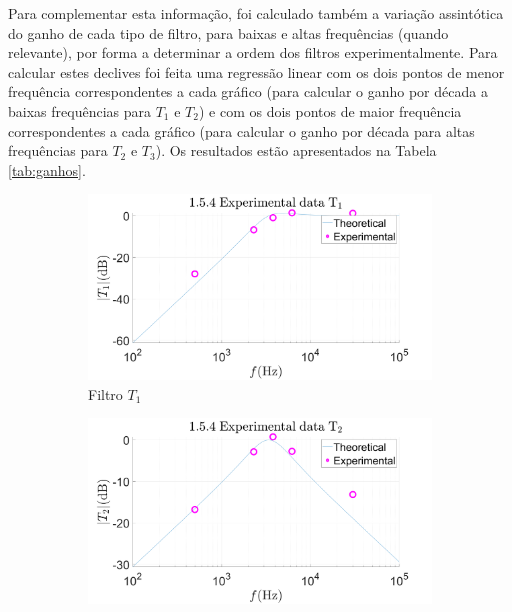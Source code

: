 Para complementar esta informação, foi calculado também a variação assintótica do ganho de cada tipo de filtro, para baixas e altas frequências (quando relevante), por forma a determinar a ordem dos filtros experimentalmente. Para calcular estes declives foi feita uma regressão linear com os dois pontos de menor frequência correspondentes a cada gráfico (para calcular o ganho por década a baixas frequências para $T_1$ e $T_2$) e com os dois pontos de maior frequência correspondentes a cada gráfico (para calcular o ganho por década para altas frequências para $T_2$ e $T_3$). Os resultados estão apresentados na Tabela \ref{tab:ganhos}. \par
\begin{figure}[ht]
     \begin{subfigure}[b]{0.45\textwidth}
         \centering
         \includegraphics[width=\textwidth]{Imagens/1_5_4_bodeExperimental1.png}
         \caption{Filtro $T_1$}
         \label{fig:bode_exp_KNH_comentar_T1}
     \end{subfigure}
     \hfill
     \begin{subfigure}[b]{0.45\textwidth}
         \centering
         \includegraphics[width=\textwidth]{Imagens/1_5_4_bodeExperimental2.png}

\end{subfigure}
\end{figure}
